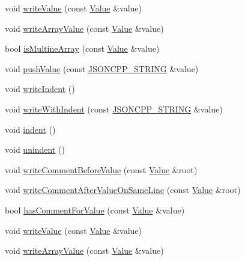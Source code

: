 \begin{DoxyCompactItemize}
\item 
void \hyperlink{class_json_1_1_styled_stream_writer_a4359250e09273fa0144021684be001ae}{write\+Value} (const \hyperlink{class_json_1_1_value}{Value} \&value)
\item 
void \hyperlink{class_json_1_1_styled_stream_writer_a606f2ddd58093c9b019d452c1b6f09fe}{write\+Array\+Value} (const \hyperlink{class_json_1_1_value}{Value} \&value)
\item 
bool \hyperlink{class_json_1_1_styled_stream_writer_a88f4d342cf25c73aabf77c1b8ba01e44}{is\+Multine\+Array} (const \hyperlink{class_json_1_1_value}{Value} \&value)
\item 
void \hyperlink{class_json_1_1_styled_stream_writer_a9adb47185695f07b1979d8f4c5347592}{push\+Value} (const \hyperlink{config_8h_a1e723f95759de062585bc4a8fd3fa4be}{J\+S\+O\+N\+C\+P\+P\+\_\+\+S\+T\+R\+I\+NG} \&value)
\item 
void \hyperlink{class_json_1_1_styled_stream_writer_a5a52fa5b406f1580a61dde3b5638e76d}{write\+Indent} ()
\item 
void \hyperlink{class_json_1_1_styled_stream_writer_a4e64789373b359c9b7a7244509b918fc}{write\+With\+Indent} (const \hyperlink{config_8h_a1e723f95759de062585bc4a8fd3fa4be}{J\+S\+O\+N\+C\+P\+P\+\_\+\+S\+T\+R\+I\+NG} \&value)
\item 
void \hyperlink{class_json_1_1_styled_stream_writer_ab49409578422aa73b060e3492dd6c72a}{indent} ()
\item 
void \hyperlink{class_json_1_1_styled_stream_writer_a74d8fb9beecd29759d7b79f430386358}{unindent} ()
\item 
void \hyperlink{class_json_1_1_styled_stream_writer_a79c3c2b320475035c47b2db484a3e434}{write\+Comment\+Before\+Value} (const \hyperlink{class_json_1_1_value}{Value} \&root)
\item 
void \hyperlink{class_json_1_1_styled_stream_writer_ad2ca860e317ca91d6b2932535b4ce9c7}{write\+Comment\+After\+Value\+On\+Same\+Line} (const \hyperlink{class_json_1_1_value}{Value} \&root)
\item 
bool \hyperlink{class_json_1_1_styled_stream_writer_ad2892f57171919fa4f8a5ae5574755cf}{has\+Comment\+For\+Value} (const \hyperlink{class_json_1_1_value}{Value} \&value)
\item 
void \hyperlink{class_json_1_1_styled_stream_writer_a4359250e09273fa0144021684be001ae}{write\+Value} (const \hyperlink{class_json_1_1_value}{Value} \&value)
\item 
void \hyperlink{class_json_1_1_styled_stream_writer_a606f2ddd58093c9b019d452c1b6f09fe}{write\+Array\+Value} (const \hyperlink{class_json_1_1_value}{Value} \&value)

\end{DoxyCompactItemize}
